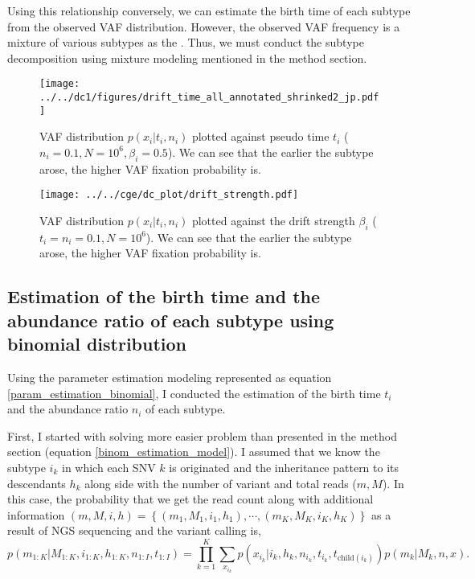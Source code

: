 \documentclass{article}
\begin{document}
Using this relationship conversely, we can estimate the birth time of each subtype from the observed VAF distribution.
However, the observed VAF frequency is a mixture of various subtypes as the .
Thus, we must conduct the subtype decomposition using mixture modeling mentioned in the method section.

\begin{figure}[H]
 \begin{minipage}[c]{0.47\hsize}
 \begin{center}
  \texttt{[image: ../../dc1/figures/drift\_time\_all\_annotated\_shrinked2\_jp.pdf]}
 \end{center}
    \caption{
  VAF distribution $p(x_i | t_i, n_i)$ plotted against pseudo time $t_i$ ($n_i=0.1, N=10^6, \beta_i=0.5$).
  We can see that the earlier the subtype arose, the higher VAF fixation probability is.
  }
    \label{fig: vaf_against_time}
\end{minipage}
 \hspace{1truecm}
\begin{minipage}[c]{0.47\hsize}
 \begin{center}
\texttt{[image: ../../cge/dc\_plot/drift\_strength.pdf]}
 \end{center}
   \caption{
 VAF distribution $p(x_i | t_i, n_i)$ plotted against the drift strength $\beta_i$ ($t_i= n_i=0.1, N=10^6$).
 We can see that the earlier the subtype arose, the higher VAF fixation probability is.
  }
   \label{vaf_against_strength}
\end{minipage}
\end{figure}

\subsection{Estimation of the birth time and the abundance ratio of each subtype using binomial distribution}
Using the parameter estimation modeling represented as equation \ref{param_estimation_binomial}, I conducted the estimation of the birth time $t_i$ and the abundance ratio $n_i$ of each subtype.

First, I started with solving more easier problem than presented in the method section (equation \ref{binom_estimation_model}).
I assumed that we know the subtype $i_k$ in which each SNV $k$ is originated and the inheritance pattern to its descendants $h_k$ along side with the number of variant and total reads ($m, M$).
In this case, the probability that we get the read count along with additional information $(m,M,i,h) = \left\{(m_1, M_1, i_1, h_1), \cdots, (m_K, M_K, i_K, h_K) \right\}$ as a result of NGS sequencing and the variant calling is,
\begin{equation}
 p(m_{1:K}|M_{1:K}, i_{1:K}, h_{1:K}, n_{1:I}, t_{1:I}) = \prod_{k=1}^{K} \sum_{x_{i_k}} p(x_{i_k} | i_k, h_k, n_{i_k}, t_{i_k}, t_{\mathrm{child}(i_k)}) p (m_k | M_k, n, x).
\end{equation}
\end{document}
